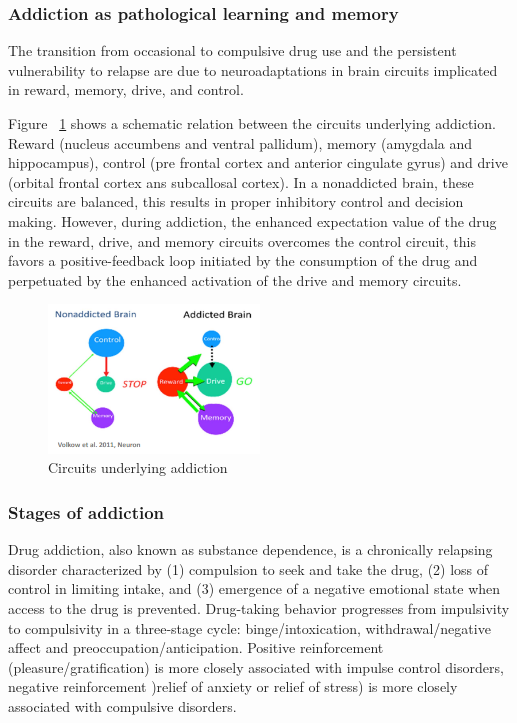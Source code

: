 \documentclass[12pt,article,oneside,a4paper]{memoir}
\begin{document}
\subsubsection{Addiction as pathological learning and memory}
The transition from occasional to compulsive drug use and the persistent vulnerability to relapse are due to neuroadaptations in brain circuits implicated in reward, memory, drive, and control.

Figure ~\ref{fig:circuits-drug-addiction} shows a schematic relation between the circuits underlying addiction. Reward (nucleus accumbens and ventral pallidum), memory (amygdala and hippocampus), control (pre frontal cortex and anterior cingulate gyrus) and drive (orbital frontal cortex ans subcallosal cortex). In a nonaddicted brain, these circuits are balanced, this results in proper inhibitory control and decision making. However, during addiction, the enhanced expectation value of the drug in the reward, drive, and memory circuits overcomes the control circuit, this favors a positive-feedback loop initiated by the consumption of the drug and perpetuated by the enhanced activation of the drive and memory circuits. 

\begin{figure}
  \centering
  \includegraphics[width=0.5\textwidth]{imgs/circuits-drug-addiction.png}
  \caption{Circuits underlying addiction}
  \label{fig:circuits-drug-addiction}
\end{figure}

\subsubsection{Stages of addiction}
Drug addiction, also known as substance dependence, is a chronically relapsing disorder characterized by (1) compulsion to seek and take the drug, (2) loss of control in limiting intake, and (3) emergence of a negative emotional state when access to the drug is prevented.
Drug-taking behavior progresses from impulsivity to compulsivity in a three-stage cycle: binge/intoxication, withdrawal/negative affect and preoccupation/anticipation. Positive reinforcement (pleasure/gratification) is more closely associated with impulse control disorders, negative reinforcement )relief of anxiety or relief of stress) is more closely associated with compulsive disorders.
\end{document}
